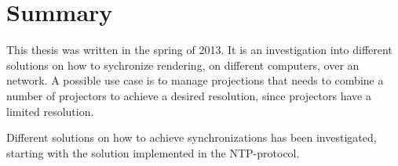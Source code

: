 \chapter{Summary}

This thesis was written in the spring of 2013. It is an investigation into different solutions on how to sychronize rendering, on different computers, over an network. A possible use case is to manage projections that needs to combine a number of projectors to achieve a desired resolution, since projectors have a limited resolution. 

Different solutions on how to achieve synchronizations has been investigated, starting with the solution implemented in the NTP-protocol. 

